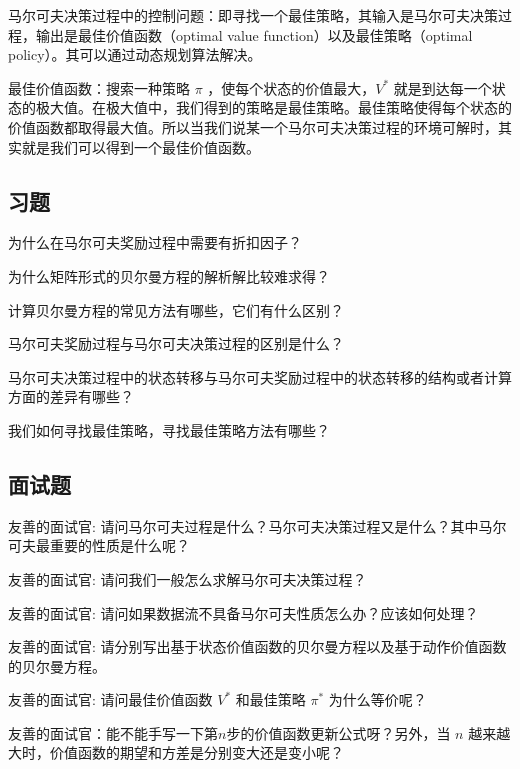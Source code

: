 马尔可夫决策过程中的控制问题：即寻找一个最佳策略，其输入是马尔可夫决策过程，输出是最佳价值函数（optimal value function）以及最佳策略（optimal policy）。其可以通过动态规划算法解决。

最佳价值函数：搜索一种策略 $\pi$ ，使每个状态的价值最大，$V^*$ 就是到达每一个状态的极大值。在极大值中，我们得到的策略是最佳策略。最佳策略使得每个状态的价值函数都取得最大值。所以当我们说某一个马尔可夫决策过程的环境可解时，其实就是我们可以得到一个最佳价值函数。


\subsection{习题}

 为什么在马尔可夫奖励过程中需要有折扣因子？

 为什么矩阵形式的贝尔曼方程的解析解比较难求得？

 计算贝尔曼方程的常见方法有哪些，它们有什么区别？

 马尔可夫奖励过程与马尔可夫决策过程的区别是什么？

 马尔可夫决策过程中的状态转移与马尔可夫奖励过程中的状态转移的结构或者计算方面的差异有哪些？

 我们如何寻找最佳策略，寻找最佳策略方法有哪些？


\subsection{面试题} 

 友善的面试官: 请问马尔可夫过程是什么？马尔可夫决策过程又是什么？其中马尔可夫最重要的性质是什么呢？

 友善的面试官: 请问我们一般怎么求解马尔可夫决策过程？

 友善的面试官: 请问如果数据流不具备马尔可夫性质怎么办？应该如何处理？

 友善的面试官: 请分别写出基于状态价值函数的贝尔曼方程以及基于动作价值函数的贝尔曼方程。

 友善的面试官: 请问最佳价值函数 $V^*$ 和最佳策略 $\pi^*$ 为什么等价呢？

 友善的面试官：能不能手写一下第$n$步的价值函数更新公式呀？另外，当 $n$ 越来越大时，价值函数的期望和方差是分别变大还是变小呢？
